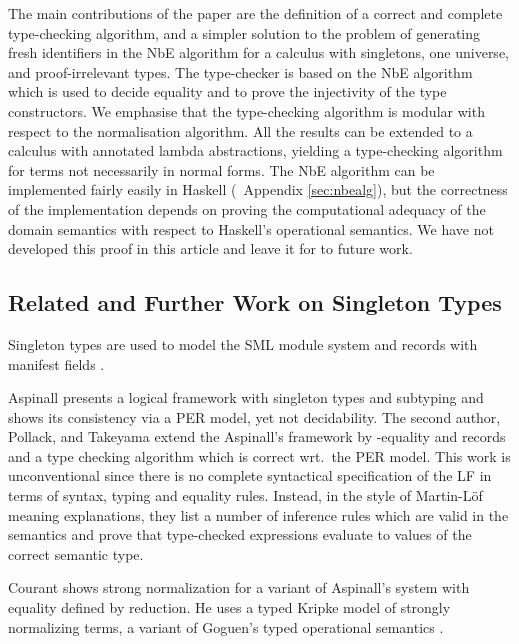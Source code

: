 \documentclass{LMCS}
\begin{document}
\noindent The main contributions of the paper are the definition of a correct
and complete type-checking algorithm, and a simpler solution to the
problem of generating fresh identifiers in the NbE algorithm for a
calculus with singletons, one universe, and proof-irrelevant
types. The type-checker is based on the NbE algorithm which is used to
decide equality and to prove the injectivity of the type
constructors. We emphasise that the type-checking algorithm is modular
with respect to the normalisation algorithm. All the results can be
extended to a calculus with annotated lambda abstractions, yielding a
type-checking algorithm for terms not necessarily in normal forms.
The NbE algorithm can be implemented fairly easily in Haskell (\cf\
Appendix \ref{sec:nbealg}), but the correctness of the implementation
depends on proving the computational adequacy of the domain semantics
with respect to Haskell's operational semantics. We have not developed
this proof in this article and leave it for to future work.




\subsection{Related and Further Work on Singleton Types}
\label{sec:related}

\noindent Singleton types are used to model the SML module system and records
with manifest fields \cite{coquandPollackTakeyama:fundinf05}.

Aspinall \cite{aspinall:csl94} presents a logical framework with
singleton types and subtyping and shows its consistency via a PER
model, yet not decidability.  
The second author, Pollack, and Takeyama
\cite{coquandPollackTakeyama:fundinf05} extend the Aspinall's
framework by -equality and records and a type checking algorithm
which is correct wrt.\ the PER model. This work is unconventional since
there is no complete syntactical specification of the LF in terms of
syntax, typing and equality rules.  Instead, in the style of
Martin-L\"of meaning explanations, they list a number of inference
rules which are valid in the semantics and prove that type-checked
expressions evaluate to values of the correct semantic type.

Courant \cite{courant:itrs02} shows strong normalization for a variant of
Aspinall's system with equality defined by reduction.  He uses a
typed Kripke model of strongly normalizing terms, a variant of
Goguen's typed operational semantics \cite{goguen:PhD}.  
\end{document}
